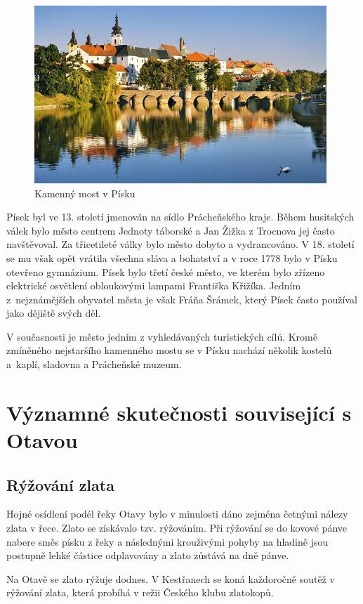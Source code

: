 \documentclass[thesis=M,czech]{FITthesis}[2012/06/26]
\begin{document}
\begin{figure}[h!]
	\centering
	\includegraphics[width=11cm]{pics/pisek.jpg}
	\caption{Kamenný most v Písku}
	\label{obrazek:pisek}
\end{figure}

Písek byl ve 13. století jmenován na sídlo Prácheňského kraje. Během husitských válek bylo město centrem Jednoty táborské a Jan Žižka z Trocnova jej často navštěvoval. Za třicetileté války bylo město dobyto a vydrancováno. V 18. století se mu však opět vrátila všechna sláva a bohatství a v roce 1778 bylo v Písku otevřeno gymnázium. Písek bylo třetí české město, ve kterém bylo zřízeno elektrické osvětlení obloukovými lampami Františka Křižíka. Jedním z~nejznámějších obyvatel města je však Fráňa Šrámek, který Písek často používal jako dějiště svých děl. 

V současnosti je město jedním z vyhledávaných turistických cílů. Kromě zmíněného nejstaršího kamenného mostu se v Písku nachází několik kostelů a~kaplí, sladovna a Prácheňské muzeum. \cite{pisek} \cite{pisek2}

\section{Významné skutečnosti související s Otavou}
\subsection{Rýžování zlata}
Hojné osídlení podél řeky Otavy bylo v minulosti dáno zejména četnými nálezy zlata v řece. Zlato se získávalo tzv. rýžováním. Při rýžování se do kovové pánve nabere směs písku z řeky a následnými krouživými pohyby na hladině jsou postupně lehké částice odplavovány a zlato zůstává na dně pánve. \cite{zlato}

Na Otavě se zlato rýžuje dodnes. V Kestřanech se koná každoročně soutěž v rýžování zlata, která probíhá v režii Českého klubu zlatokopů. 
\end{document}
